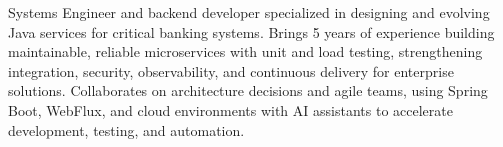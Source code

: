 Systems Engineer and backend developer specialized in designing and evolving Java services for critical banking systems. Brings 5 years of experience building maintainable, reliable microservices with unit and load testing, strengthening integration, security, observability, and continuous delivery for enterprise solutions. Collaborates on architecture decisions and agile teams, using Spring Boot, WebFlux, and cloud environments with AI assistants to accelerate development, testing, and automation.
